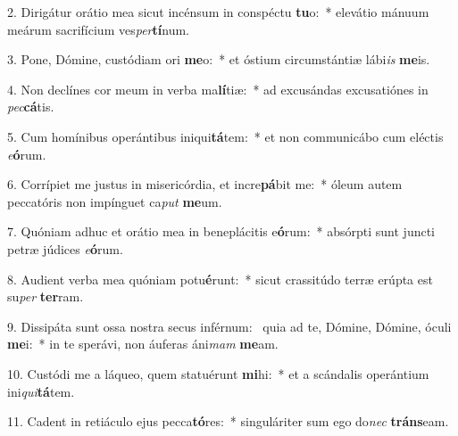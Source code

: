 2. Dirigátur orátio mea sicut incénsum in conspéctu \textbf{tu}o:~*  elevátio mánuum meárum sacrifícium ves\textit{per}\textbf{tí}num.\

3. Pone, Dómine, custódiam ori \textbf{me}o:~*  et óstium circumstántiæ lábi\textit{is} \textbf{me}is.\

4. Non declínes cor meum in verba ma\textbf{lí}tiæ:~*  ad excusándas excusatiónes in \textit{pec}\textbf{cá}tis.\

5. Cum homínibus operántibus iniqui\textbf{tá}tem:~*  et non communicábo cum eléctis \textit{e}\textbf{ó}rum.\

6. Corrípiet me justus in misericórdia, et incre\textbf{pá}bit me:~*  óleum autem peccatóris non impínguet ca\textit{put} \textbf{me}um.\

7. Quóniam adhuc et orátio mea in beneplácitis e\textbf{ó}rum:~*  absórpti sunt juncti petræ júdices \textit{e}\textbf{ó}rum.\

8. Audient verba mea quóniam potu\textbf{é}runt:~*  sicut crassitúdo terræ erúpta est su\textit{per} \textbf{ter}ram.\

9. Dissipáta sunt ossa nostra secus inférnum: \dag\  quia ad te, Dómine, Dómine, óculi \textbf{me}i:~*  in te sperávi, non áuferas áni\textit{mam} \textbf{me}am.\

10. Custódi me a láqueo, quem statuérunt \textbf{mi}hi:~*  et a scándalis operántium ini\textit{qui}\textbf{tá}tem.\

11. Cadent in retiáculo ejus pecca\textbf{tó}res:~*  singuláriter sum ego do\textit{nec} \textbf{tráns}eam.\


